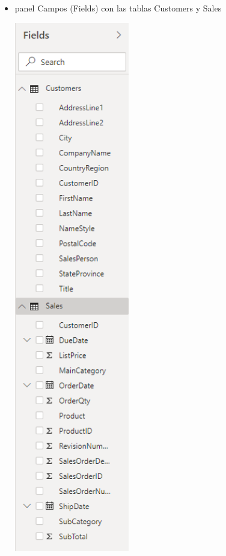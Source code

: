 \begin{itemize}
	\item  panel Campos (Fields) con las tablas Customers y Sales
	\begin{center}
	\includegraphics[width=5cm]{./Imagenes/Captura2-1} 
	\end{center}
\end{itemize} 

